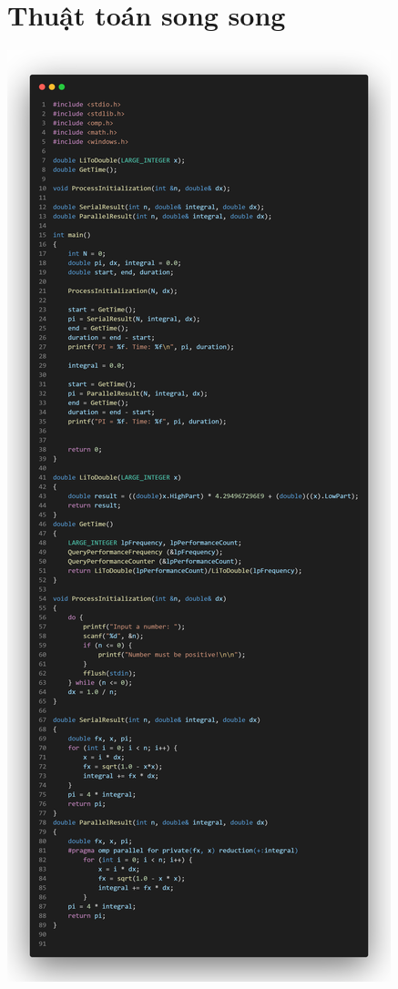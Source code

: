\documentclass[12pt,a4paper]{report}
\begin{document}
\section{Thuật toán song song}
\begin{center}
	\includegraphics[trim=0in 20in 0in 0in, clip, scale=0.2]{./Photos/PI/parallel.PNG}

\end{center}
\end{document}

